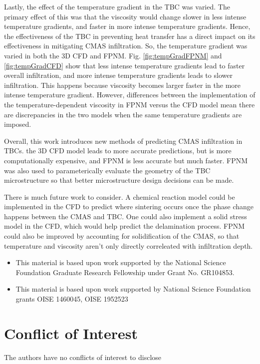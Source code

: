 \documentclass[%
 aip,
 amsmath,amssymb,
 reprint,%
floatfix]{revtex4-1}
\begin{document}
Lastly, the effect of the temperature gradient in the TBC was varied. The primary effect of this was that the viscosity would change slower in less intense temperature gradients, and faster in more intense temperature gradients. Hence, the effectiveness of the TBC in preventing heat transfer has a direct impact on its effectiveness in mitigating CMAS infiltration. So, the temperature gradient was varied in both the 3D CFD and FPNM. Fig. \ref{fig:tempGradFPNM} and \ref{fig:tempGradCFD} show that less intense temperature gradients lead to faster overall infiltration, and more intense temperature gradients leads to slower infiltration. This happens because viscosity becomes larger faster in the more intense temperature gradient. However, differences between the implementation of the temperature-dependent viscosity in FPNM versus the CFD model mean there are discrepancies in the two models when the same temperature gradients are imposed.

Overall, this work introduces new methods of predicting CMAS infiltration in TBCs. the 3D CFD model leads to more accurate predictions, but is more computationally expensive, and FPNM is less accurate but much faster. FPNM was also used to parameterically evaluate the geometry of the TBC microstructure so that better microstructure design decisions can be made. 

There is much future work to consider. A chemical reaction model could be implemented in the CFD to predict where sintering occurs once the phase change happens between the CMAS and TBC. One could also implement a solid stress model in the CFD, which would help predict the delamination process. FPNM could also be improved by accounting for solidification of the CMAS, so that temperature and viscosity aren't only directly correleated with infiltration depth.

\begin{acknowledgments}
\begin{itemize}
\item This material is based upon work supported 
by the National Science Foundation 
Graduate Research Fellowship under Grant 
No. GR104853.
\item This material is based upon work supported 
by National Science Foundation grants OISE 
1460045, OISE 1952523
\end{itemize}
\end{acknowledgments}

\section*{Conflict of Interest}
The authors have no conflicts of interest to disclose
\end{document}
